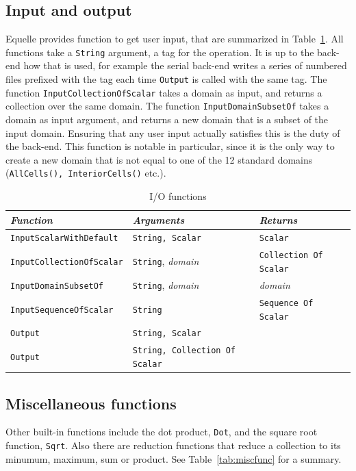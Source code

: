 \documentclass[11pt]{article}
\newcommand{\code}[1]{\texttt{#1}}
\begin{document}
\subsection{Input and output}

Equelle provides function to get user input, that are summarized in
Table~\ref{tab:iofunc}. All functions take a \code{String} argument, a tag for the
operation. It is up to the back-end how that is used, for example the serial back-end
writes a series of numbered files prefixed with the tag each time \code{Output} is called
with the same tag. The function \code{InputCollectionOfScalar} takes a domain as input,
and returns a collection over the same domain. The function \code{InputDomainSubsetOf}
takes a domain as input argument, and returns a new domain that is a subset of the input
domain. Ensuring that any user input actually satisfies this is the duty of the
back-end. This function is notable in particular, since it is the only way to create a new
domain that is not equal to one of the 12 standard domains (\code{AllCells(),
InteriorCells()} etc.).

\begin{table}
\begin{tabular}{l|l|l}
{\em Function} & {\em Arguments} & {\em Returns} \\
\hline
\code{InputScalarWithDefault} & \code{String, Scalar} & \code{Scalar} \\
\code{InputCollectionOfScalar} & \code{String}, {\em domain} & \code{Collection Of Scalar} \\
\code{InputDomainSubsetOf} & \code{String}, {\em domain} & {\em domain} \\
\code{InputSequenceOfScalar} & \code{String} & \code{Sequence Of Scalar} \\
\code{Output} & \code{String, Scalar} & \\
\code{Output} & \code{String, Collection Of Scalar} & \\
\end{tabular}
\caption{I/O functions}
\label{tab:iofunc}
\end{table}

\subsection{Miscellaneous functions}

Other built-in functions include the dot product, \code{Dot}, and the square root
function, \code{Sqrt}. Also there are reduction functions that reduce a collection to its
minumum, maximum, sum or product. See Table~\ref{tab:miscfunc} for a summary.
\end{document}
